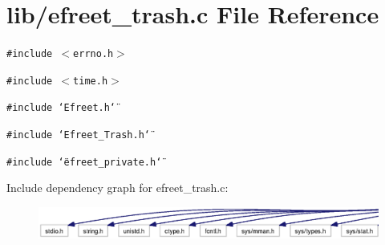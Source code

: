 \section{lib/efreet\_\-trash.c File Reference}
\label{efreet__trash_8c}


{\tt \#include $<$errno.h$>$}\par
{\tt \#include $<$time.h$>$}\par
{\tt \#include \char`\"{}Efreet.h\char`\"{}}\par
{\tt \#include \char`\"{}Efreet\_\-Trash.h\char`\"{}}\par
{\tt \#include \char`\"{}efreet\_\-private.h\char`\"{}}\par


Include dependency graph for efreet\_\-trash.c:\nopagebreak
\begin{figure}[H]
\begin{center}
\leavevmode
\includegraphics[width=420pt]{efreet__trash_8c__incl}
\end{center}
\end{figure}
